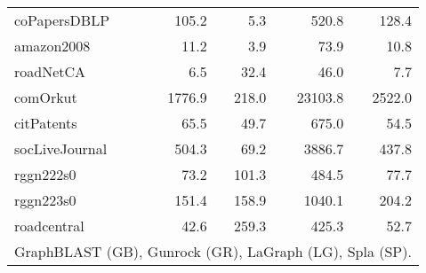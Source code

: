 \begin{table}[tbp]
\begin{center}
\begin{tabular}{|l|r|r|r|r|}
        \rowcolor{black!2 } coPapersDBLP&105.2&5.3&520.8&128.4\\
        \rowcolor{black!10} amazon2008&11.2&3.9&73.9&10.8\\
        \rowcolor{black!2 } roadNetCA&6.5&32.4&46.0&7.7\\
        \rowcolor{black!10} comOrkut&1776.9&218.0&23103.8&2522.0\\
        \rowcolor{black!2 } citPatents&65.5&49.7&675.0&54.5\\
        \rowcolor{black!10} socLiveJournal&504.3&69.2&3886.7&437.8\\
        \rowcolor{black!2 } rggn222s0&73.2&101.3&484.5&77.7\\
        \rowcolor{black!10} rggn223s0&151.4&158.9&1040.1&204.2\\
        \rowcolor{black!2 } roadcentral&42.6&259.3&425.3&52.7\\
        \hline
        \hline
        \multicolumn{5}{l}{GraphBLAST (GB), Gunrock (GR), LaGraph (LG), Spla (SP).} \\
        \end{tabular}
        \label{rq1_table}
    \end{center}
    \end{table}
    
